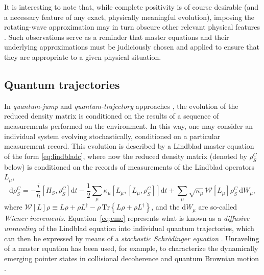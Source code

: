 \documentclass[3p,sort&compress,12pt]{elsarticle}
\newcommand{\D}{\ensuremath{\mathrm{d}}}
\newcommand{\I}{\ensuremath{i}}
\newcommand{\op}[1]{#1}
\begin{document}
It is interesting to note that, while complete positivity is of course desirable (and a necessary feature of any exact, physically meaningful evolution), imposing the rotating-wave approximation may in turn obscure other relevant physical features \cite{Dodin:2018:zz}. Such observations serve as a reminder that master equations and their underlying approximations must be judiciously chosen and applied to ensure that they are appropriate to a given physical situation.


\subsection{\label{sec:quantum-trajectories}Quantum trajectories} 

In \emph{quantum-jump} and \emph{quantum-trajectory} approaches \cite{Barchielli:1991:fv,Belavkin:1989:an,Belavkin:1989:am,Belavkin:1989:um,Belavkin:1995:tt,Diosi:1988:wx,Diosi:1988:hn,Diosi:1988:bv,Gisin:1984:qs,Gisin:1989:jn,Wiseman:1994:qq,Goan:2001:rz,Plenio:1998:bb}, the evolution of the reduced density matrix is conditioned on the results of a sequence of measurements performed on the environment. In this way, one may consider an individual system evolving stochastically, conditioned on a particular measurement record. This evolution is described by a Lindblad master equation of the form \eqref{eq:lindbladc}, where now the reduced density matrix (denoted by $\op{\rho}^C_S$ below) is conditioned on the records of measurements of the Lindblad operators $\op{L}_\mu$,
%
\begin{equation} \label{eq:cme}
\D \op{\rho}^C_S = -\frac{\I}{\hbar} \left[\op{H}_S, \op{\rho}_S^C \right] \D t  - \frac{1}{2} \sum_\mu \kappa_\mu \left[\op{L}_\mu, \left[\op{L}_\mu, \op{\rho}_S^C\right] \right] \D t + \sum_\mu \sqrt{\kappa_\mu} \, \mathcal{W}[\op{L}_\mu] \op{\rho}_S^C \, \D W_\mu,  
\end{equation}
%
where $\mathcal{W}[L]\op{\rho} \equiv L \op{\rho} + \op{\rho} L^\dagger - \op{\rho} \, \text{Tr} \left\{ L\op{\rho} + \op{\rho} L^\dagger \right\}$, and the $\D W_\mu$ are so-called \emph{Wiener increments}. Equation~\eqref{eq:cme} represents what is known as a \emph{diffusive unraveling} of the Lindblad equation into individual quantum trajectories, which can then be expressed by means of a \emph{stochastic Schr\"odinger equation} \cite{Barchielli:1991:fv,Belavkin:1989:an,Belavkin:1989:am,Belavkin:1989:um,Belavkin:1995:tt,Diosi:1988:wx,Diosi:1988:hn,Diosi:1988:bv,Gisin:1984:qs,Gisin:1989:jn,Wiseman:1994:qq,Goan:2001:rz,Plenio:1998:bb}. Unraveling of a master equation has been used, for example, to characterize the dynamically emerging pointer states in collisional decoherence \cite{Busse:2009:aa,Busse:2010:aa} and quantum Brownian motion \cite{Sorgel:2015:pp}. 
\end{document}
